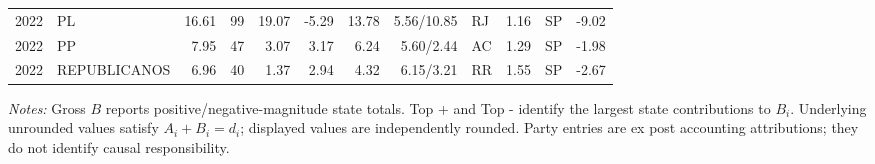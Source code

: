 \begin{landscape}
\begin{longtable}{rlrrrrrrlrlr}
2022 & PL & 16.61 & 99 & 19.07 & -5.29 & 13.78 & 5.56/10.85 & RJ & 1.16 & SP & -9.02 \\
2022 & PP & 7.95 & 47 & 3.07 & 3.17 & 6.24 & 5.60/2.44 & AC & 1.29 & SP & -1.98 \\
2022 & REPUBLICANOS & 6.96 & 40 & 1.37 & 2.94 & 4.32 & 6.15/3.21 & RR & 1.55 & SP & -2.67 \\
\end{longtable}
\noindent\footnotesize\textit{Notes:} Gross \(B\) reports positive/negative-magnitude state totals. Top + and Top - identify the largest state contributions to \(B_i\). Underlying unrounded values satisfy \(A_i+B_i=d_i\); displayed values are independently rounded. Party entries are ex post accounting attributions; they do not identify causal responsibility.
\endgroup
\end{landscape}

